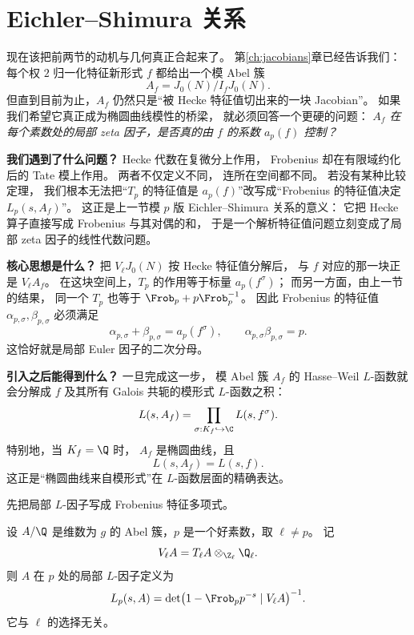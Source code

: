 \section{Eichler--Shimura 关系}
\label{sec:eichler-shimura-relation}

现在该把前两节的动机与几何真正合起来了。
第\ref{ch:jacobians}章已经告诉我们：
每个权 $2$ 归一化特征新形式 $f$ 都给出一个模 Abel 簇
\[
  A_f=J_0(N)/I_fJ_0(N).
\]
但直到目前为止，$A_f$ 仍然只是“被 Hecke 特征值切出来的一块 Jacobian”。
如果我们希望它真正成为椭圆曲线模性的桥梁，
就必须回答一个更硬的问题：
\emph{$A_f$ 在每个素数处的局部 zeta 因子，是否真的由 $f$ 的系数 $a_p(f)$ 控制？}

\textbf{我们遇到了什么问题？}
Hecke 代数在复微分上作用，
Frobenius 却在有限域约化后的 Tate 模上作用。
两者不仅定义不同，
连所在空间都不同。
若没有某种比较定理，
我们根本无法把“$T_p$ 的特征值是 $a_p(f)$”改写成“Frobenius 的特征值决定 $L_p(s,A_f)$”。
这正是上一节模 $p$ 版 Eichler--Shimura 关系的意义：
它把 Hecke 算子直接写成 Frobenius 与其对偶的和，
于是一个解析特征值问题立刻变成了局部 zeta 因子的线性代数问题。

\textbf{核心思想是什么？}
把 $V_\ell J_0(N)$ 按 Hecke 特征值分解后，
与 $f$ 对应的那一块正是 $V_\ell A_f$。
在这块空间上，$T_p$ 的作用等于标量 $a_p(f^\sigma)$；
而另一方面，由上一节的结果，
同一个 $T_p$ 也等于 $\Frob_p+p\Frob_p^{-1}$。
因此 Frobenius 的特征值 $\alpha_{p,\sigma},\beta_{p,\sigma}$ 必须满足
\[
  \alpha_{p,\sigma}+\beta_{p,\sigma}=a_p(f^\sigma),
  \qquad
  \alpha_{p,\sigma}\beta_{p,\sigma}=p.
\]
这恰好就是局部 Euler 因子的二次分母。

\textbf{引入之后能得到什么？}
一旦完成这一步，
模 Abel 簇 $A_f$ 的 Hasse--Weil $L$-函数就会分解成 $f$ 及其所有 Galois 共轭的模形式 $L$-函数之积：
\[
  L(s,A_f)=\prod_{\sigma:K_f\hookrightarrow\C}L(s,f^\sigma).
\]
特别地，当 $K_f=\Q$ 时，
$A_f$ 是椭圆曲线，且
\[
  L(s,A_f)=L(s,f).
\]
这正是“椭圆曲线来自模形式”在 $L$-函数层面的精确表达。



先把局部 $L$-因子写成 Frobenius 特征多项式。

\begin{definition}
\label{def:ch08-local-factor-abelian}
设 $A/\Q$ 是维数为 $g$ 的 Abel 簇，$p$ 是一个好素数，取 $\ell\neq p$。
记
\[
  V_\ell A = T_\ell A\otimes_{\Z_\ell}\Q_\ell.
\]
则 $A$ 在 $p$ 处的局部 $L$-因子定义为
\[
  L_p(s,A)=\det\bigl(1-\Frob_p p^{-s}\mid V_\ell A\bigr)^{-1}.
\]
它与 $\ell$ 的选择无关。
\end{definition}

